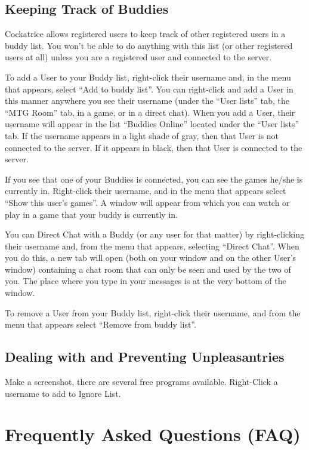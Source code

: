 \documentclass[a4paper]{scrbook}
\begin{document}
\section{Keeping Track of Buddies}


Cockatrice allows registered users to keep track of other registered users in a buddy list. You won't be able to do anything with this list (or other registered users at all) unless you are a registered user and connected to the server.

To add a User to your Buddy list, right-click their username and, in the menu that appears, select “Add to buddy list”. You can right-click and add a User in this manner anywhere you see their username (under the “User lists” tab, the “MTG Room” tab, in a game, or in a direct chat). When you add a User, their username will appear in the list “Buddies Online” located under the “User lists” tab. If the username appears in a light shade of gray, then that User is not connected to the server. If it appears in black, then that User is connected to the server.

If you see that one of your Buddies is connected, you can see the games he/she is currently in. Right-click their username, and in the menu that appears select “Show this user's games”. A window will appear from which you can watch or play in a game that your buddy is currently in.

You can Direct Chat with a Buddy (or any user for that matter) by right-clicking their username and, from the menu that appears, selecting “Direct Chat”. When you do this, a new tab will open (both on your window and on the other User's window) containing a chat room that can only be seen and used by the two of you. The place where you type in your messages is at the very bottom of the window.

To remove a User from your Buddy list, right-click their username, and from the menu that appears select “Remove from buddy list”.

\section{Dealing with and Preventing Unpleasantries}
Make a screenshot, there are several free programs available.
Right-Click a username to add to Ignore List.

\chapter{Frequently Asked Questions (FAQ)}
\end{document}
